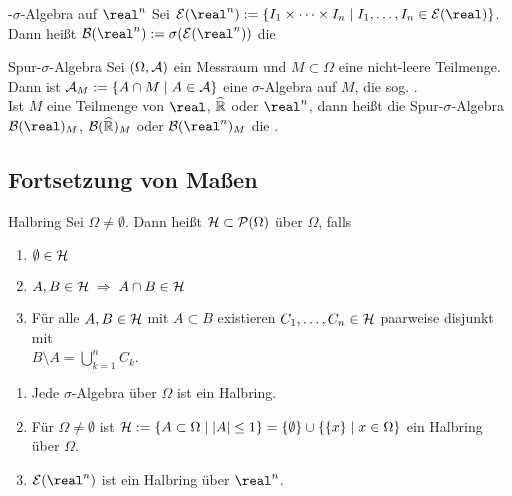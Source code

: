 \begin{Def}{-$\sigma$-Algebra auf $\real^n$}
    Sei $\E(\real^n) :=
    \{I_1 \times \dotsb \times I_n \;|\; I_1, \dotsc, I_n \in \E(\real)\}$.\\
    Dann heißt $\B(\real^n) := \sigma(\E(\real^n))$ die
\end{Def}

\begin{Def}{Spur-$\sigma$-Algebra}
    Sei $(\Omega, \mathcal{A})$ ein Messraum und $M \subset \Omega$ eine nicht-leere Teilmenge.\\
    Dann ist $\mathcal{A}_M := \{A \cap M \;|\; A \in \mathcal{A}\}$ eine $\sigma$-Algebra auf $M$,
    die sog. .\\
    Ist $M$ eine Teilmenge von $\real$, $\widehat{\mathbb{R}}$ oder $\real^n$,
    dann heißt die Spur-$\sigma$-Algebra $\B(\real)_M$, $\mathcal{B}(\widehat{\mathbb{R}})_M$ oder $\B(\real^n)_M$
    die .
\end{Def}

\subsection{%
    Fortsetzung von Maßen%
}

\begin{Def}{Halbring}
    Sei $\Omega \not= \emptyset$.
    Dann heißt $\mathcal{H} \subset \mathcal{P}(\Omega)$  über $\Omega$, falls
    \begin{enumerate}
        \item
        $\emptyset \in \mathcal{H}$

        \item
        $A, B \in \mathcal{H} \;\Rightarrow\; A \cap B \in \mathcal{H}$

        \item
        Für alle $A, B \in \mathcal{H}$ mit $A \subset B$ existieren $C_1, \dotsc, C_n \in \mathcal{H}$
        paarweise disjunkt mit\\
        $B \setminus A = \bigcup_{k=1}^n C_k$.
    \end{enumerate}
\end{Def}

\begin{Bsp}
    \begin{enumerate}
        \item
        Jede $\sigma$-Algebra über $\Omega$ ist ein Halbring.

        \item
        Für $\Omega \not= \emptyset$ ist $\mathcal{H} := \{A \subset \Omega \;|\; |A| \le 1\} =
        \{\emptyset\} \cup \{\{x\} \;|\; x \in \Omega\}$ ein Halbring über $\Omega$.

        \item
        $\E(\real^n)$ ist ein Halbring über $\real^n$.
    \end{enumerate}
\end{Bsp}

